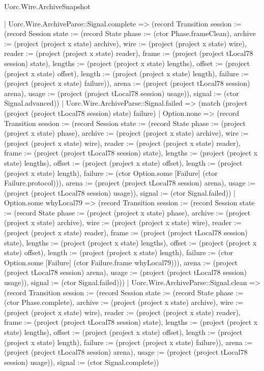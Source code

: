 \begin{lexlean}{Uorc.Wire.ArchiveSnapshot}
\begin{semanticmodule}
{        | Uorc.Wire.ArchiveParse::Signal.complete => (record Transition {session := (record Session {state := (record State {phase := (ctor Phase.frameClean), archive := (project (project x state) archive), wire := (project (project x state) wire), reader := (project (project x state) reader), frame := (project (project tLocal78 session) state), lengths := (project (project x state) lengths), offset := (project (project x state) offset), length := (project (project x state) length), failure := (project (project x state) failure)}), arena := (project (project tLocal78 session) arena), usage := (project (project tLocal78 session) usage)}), signal := (ctor Signal.advanced)})
        | Uorc.Wire.ArchiveParse::Signal.failed => (match (project (project (project tLocal78 session) state) failure)
          | Option.none => (record Transition {session := (record Session {state := (record State {phase := (project (project x state) phase), archive := (project (project x state) archive), wire := (project (project x state) wire), reader := (project (project x state) reader), frame := (project (project tLocal78 session) state), lengths := (project (project x state) lengths), offset := (project (project x state) offset), length := (project (project x state) length), failure := (ctor Option.some [Failure] (ctor Failure.protocol))}), arena := (project (project tLocal78 session) arena), usage := (project (project tLocal78 session) usage)}), signal := (ctor Signal.failed)})
          | Option.some whyLocal79 => (record Transition {session := (record Session {state := (record State {phase := (project (project x state) phase), archive := (project (project x state) archive), wire := (project (project x state) wire), reader := (project (project x state) reader), frame := (project (project tLocal78 session) state), lengths := (project (project x state) lengths), offset := (project (project x state) offset), length := (project (project x state) length), failure := (ctor Option.some [Failure] (ctor Failure.frame whyLocal79))}), arena := (project (project tLocal78 session) arena), usage := (project (project tLocal78 session) usage)}), signal := (ctor Signal.failed)}))
        | Uorc.Wire.ArchiveParse::Signal.clean => (record Transition {session := (record Session {state := (record State {phase := (ctor Phase.complete), archive := (project (project x state) archive), wire := (project (project x state) wire), reader := (project (project x state) reader), frame := (project (project tLocal78 session) state), lengths := (project (project x state) lengths), offset := (project (project x state) offset), length := (project (project x state) length), failure := (project (project x state) failure)}), arena := (project (project tLocal78 session) arena), usage := (project (project tLocal78 session) usage)}), signal := (ctor Signal.complete)})
}
\end{semanticmodule}
\end{lexlean}
